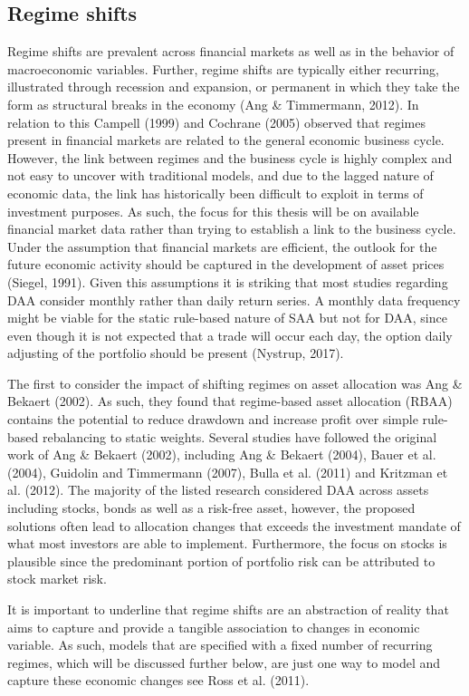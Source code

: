 \subsection{Regime shifts}
Regime shifts are prevalent across financial markets as well as in the behavior of macroeconomic variables. Further, regime shifts are typically either recurring, illustrated through recession and expansion, or permanent in which they take the form as structural breaks in the economy (Ang \& Timmermann, 2012). In relation to this Campell (1999) and Cochrane (2005) observed that regimes present in financial markets are related to the general economic business cycle. However, the link between regimes and the business cycle is highly complex and not easy to uncover with traditional models, and due to the lagged nature of economic data, the link has historically been difficult to exploit in terms of investment purposes. As such, the focus for this thesis will be on available financial market data rather than trying to establish a link to the business cycle. Under the assumption that financial markets are efficient, the outlook for the future economic activity should be captured in the development of asset prices (Siegel, 1991). Given this assumptions it is striking that most studies regarding DAA consider monthly rather than daily return series. A monthly data frequency might be viable for the static rule-based nature of SAA but not for DAA, since even though it is not expected that a trade will occur each day, the option daily adjusting of the portfolio should be present (Nystrup, 2017). 

The first to consider the impact of shifting regimes on asset allocation was Ang \& Bekaert (2002). As such, they found that regime-based asset allocation (RBAA) contains the potential to reduce drawdown and increase profit over simple rule-based rebalancing to static weights. Several studies have followed the original work of Ang \& Bekaert (2002), including Ang \& Bekaert (2004), Bauer et al.
(2004), Guidolin and Timmermann (2007), Bulla et al. (2011) and Kritzman et al. (2012). The majority of the listed research considered DAA across assets including stocks, bonds as well as a risk-free asset, however, the proposed solutions often lead to allocation changes that exceeds the investment mandate of what most investors are able to implement. Furthermore, the focus on stocks is plausible since the predominant portion of portfolio risk can be attributed to stock market risk. 

It is important to underline that regime shifts are an abstraction of reality that aims to capture and provide a tangible association to changes in economic variable. As such, models that are specified with a fixed number of recurring regimes, which will be discussed further below, are just one way to model and capture these economic changes see Ross et al. (2011). 


